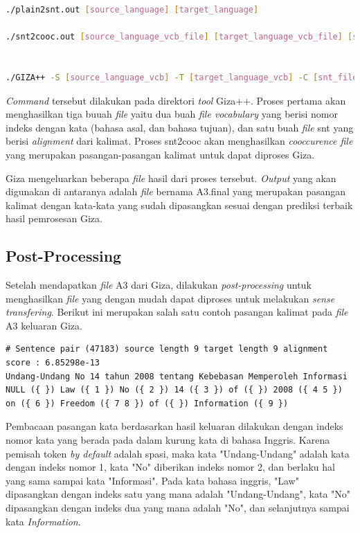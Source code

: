 \clearpage

\begin{lstlisting}[language=bash,caption={\textit{Word  alignment} dengan Giza++}, label={word-alignment}]
./plain2snt.out [source_language] [target_language]

./snt2cooc.out [source_language_vcb_file] [target_language_vcb_file] [snt_file] > [coocurrence_file]


./GIZA++ -S [source_language_vcb] -T [target_language_vcb] -C [snt_file] -CoocurrenceFile [cooc_file]
\end{lstlisting}

\textit{Command} tersebut dilakukan pada direktori \textit{tool} Giza++. Proses pertama akan menghasilkan tiga buuah \textit{file} yaitu dua buah \textit{file vocabulary} yang berisi nomor indeks dengan kata (bahasa asal, dan bahasa tujuan), dan satu buah \textit{file} snt yang berisi \textit{alignment} dari kalimat. Proses snt2cooc akan menghasilkan \textit{cooccurence file} yang merupakan pasangan-pasangan kalimat untuk dapat diproses Giza.

Giza mengeluarkan beberapa \textit{file} hasil dari proses tersebut. \textit{Output} yang akan digunakan di antaranya adalah \textit{file} bernama A3.final yang merupakan pasangan kalimat dengan kata-kata yang sudah dipasangkan sesuai dengan prediksi terbaik hasil pemrosesan Giza.

\subsection{Post-Processing}
Setelah mendapatkan \textit{file} A3 dari Giza, dilakukan \textit{post-processing} untuk menghasilkan \textit{file} yang dengan mudah dapat diproses untuk melakukan \textit{sense transfering}. Berikut ini merupakan salah satu contoh pasangan kalimat pada \textit{file} A3 keluaran Giza.

\begin{lstlisting}[backgroundcolor = \color{white}]
# Sentence pair (47183) source length 9 target length 9 alignment score : 6.85298e-13
Undang-Undang No 14 tahun 2008 tentang Kebebasan Memperoleh Informasi 
NULL ({ }) Law ({ 1 }) No ({ 2 }) 14 ({ 3 }) of ({ }) 2008 ({ 4 5 }) on ({ 6 }) Freedom ({ 7 8 }) of ({ }) Information ({ 9 })
\end{lstlisting}

Pembacaan pasangan kata berdasarkan hasil keluaran dilakukan dengan indeks nomor kata yang berada pada dalam kurung kata di bahasa Inggris. Karena pemisah token \textit{by default} adalah spasi, maka kata "Undang-Undang" adalah kata dengan indeks nomor 1, kata "No" diberikan indeks nomor 2, dan berlaku hal yang sama sampai kata "Informasi". Pada kata bahasa inggris, "Law" dipasangkan dengan indeks satu yang mana adalah "Undang-Undang", kata "No" dipasangkan dengan indeks dua yang mana adalah "No", dan selanjutnya sampai kata \textit{Information}. 

